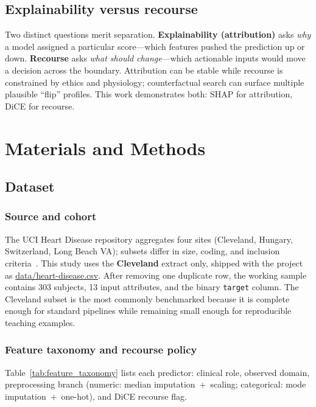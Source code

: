 \documentclass[11pt,a4paper]{article}
\begin{document}
\subsection{Explainability versus recourse}

Two distinct questions merit separation. \textbf{Explainability (attribution)} asks \emph{why} a model assigned a particular score—which features pushed the prediction up or down. \textbf{Recourse} asks \emph{what should change}—which actionable inputs would move a decision across the boundary. Attribution can be stable while recourse is constrained by ethics and physiology; counterfactual search can surface multiple plausible ``flip'' profiles. This work demonstrates both: SHAP for attribution, DiCE for recourse.

\section{Materials and Methods}
\label{sec:methods}

\subsection{Dataset}
\label{sec:dataset}

\subsubsection{Source and cohort}

The UCI Heart Disease repository aggregates four sites (Cleveland, Hungary, Switzerland, Long Beach VA); subsets differ in size, coding, and inclusion criteria~\cite{uci}. This study uses the \textbf{Cleveland} extract only, shipped with the project as \url{data/heart-disease.csv}. After removing one duplicate row, the working sample contains \num{303} subjects, \num{13} input attributes, and the binary \texttt{target} column. The Cleveland subset is the most commonly benchmarked because it is complete enough for standard pipelines while remaining small enough for reproducible teaching examples.

\subsubsection{Feature taxonomy and recourse policy}
\label{sec:features}

Table~\ref{tab:feature_taxonomy} lists each predictor: clinical role, observed domain, preprocessing branch (numeric: median imputation~+~scaling; categorical: mode imputation~+~one-hot), and DiCE recourse flag.
\end{document}
